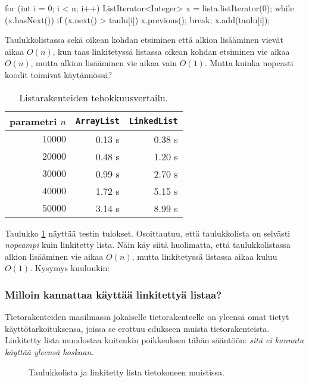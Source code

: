 \begin{code}
for (int i = 0; i < n; i++) {
    ListIterator<Integer> x = lista.listIterator(0);
    while (x.hasNext()) {
        if (x.next() > taulu[i]) {
            x.previous();
            break;
        }
    }
    x.add(taulu[i]);
}
\end{code}

Taulukkolistassa sekä oikean kohdan etsiminen että alkion lisääminen
vievät aikaa $O(n)$, kun taas linkitetyssä listassa
oikean kohdan etsiminen vie aikaa $O(n)$, mutta alkion lisääminen
vie aikaa vain $O(1)$.
Mutta kuinka nopeasti koodit toimivat käytännössä?

\begin{table}
\center
\begin{tabular}{rrr}
parametri $n$ & \texttt{ArrayList} & \texttt{LinkedList} \\
\hline
$10000$ & 0.13 s & 0.38 s \\
$20000$ & 0.48 s & 1.20 s \\
$30000$ & 0.99 s & 2.70 s \\
$40000$ & 1.72 s & 5.15 s \\
$50000$ & 3.14 s & 8.99 s \\
\end{tabular}
\caption{Listarakenteiden tehokkuusvertailu.}
\label{tab:listes}
\end{table}

Taulukko \ref{tab:listes} näyttää testin tulokset.
Osoittautuu, että taulukkolista on selvästi
\emph{nopeampi} kuin linkitetty lista.
Näin käy siitä huolimatta, että taulukkolistassa
alkion lisääminen vie aikaa $O(n)$, mutta linkitetyssä
listassa aikaa kuluu $O(1)$.
Kysymys kuuluukin:

\subsubsection{Milloin kannattaa käyttää linkitettyä listaa?}

Tietorakenteiden maailmassa jokaiselle tietorakenteelle
on yleensä omat tietyt käyttötarkoituksensa,
joissa se erottuu edukseen muista tietorakenteista.
Linkitetty lista muodostaa kuitenkin poikkeuksen tähän sääntöön:
\emph{sitä ei kannata käyttää yleensä koskaan}.

\begin{figure}
\center
{}
\caption{Taulukkolista ja linkitetty lista tietokoneen muistissa.}
\label{fig:taulin}
\end{figure}

